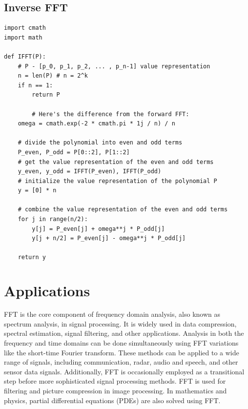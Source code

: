 \documentclass[28]{report}
\begin{document}
\newpage
\section{Inverse FFT} 

\begin{verbatim}
import cmath
import math

def IFFT(P):
	# P - [p_0, p_1, p_2, ... , p_n-1] value representation
	n = len(P) # n = 2^k
	if n == 1:
		return P

        # Here's the difference from the forward FFT:
	omega = cmath.exp(-2 * cmath.pi * 1j / n) / n

	# divide the polynomial into even and odd terms
	P_even, P_odd = P[0::2], P[1::2]
	# get the value representation of the even and odd terms
	y_even, y_odd = IFFT(P_even), IFFT(P_odd)
	# initialize the value representation of the polynomial P
	y = [0] * n

	# combine the value representation of the even and odd terms
	for j in range(n/2):
		y[j] = P_even[j] + omega**j * P_odd[j]
		y[j + n/2] = P_even[j] - omega**j * P_odd[j]

	return y
\end{verbatim}

\chapter{Applications}
FFT is the core component of frequency domain analysis, also known as spectrum analysis, in signal processing. It is widely used in data compression, spectral estimation, signal filtering, and other applications. Analysis in both the frequency and time domains can be done simultaneously using FFT variations like the short-time Fourier transform. These methods can be applied to a wide range of signals, including communication, radar, audio and speech, and other sensor data signals. Additionally, FFT is occasionally employed as a transitional step before more sophisticated signal processing methods. FFT is used for filtering and picture compression in image processing. In mathematics and physics, partial differential equations (PDEs) are also solved using FFT.
\end{document}

